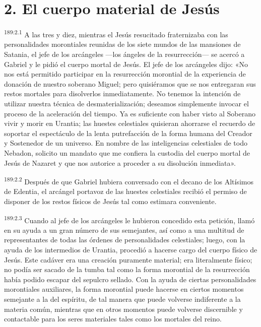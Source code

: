 \section*{2. El cuerpo material de Jesús}
\par
\textsuperscript{189:2.1} A las tres y diez, mientras el Jesús resucitado fraternizaba con las personalidades morontiales reunidas de los siete mundos de las mansiones de Satania, el jefe de los arcángeles ---los ángeles de la resurrección--- se acercó a Gabriel y le pidió el cuerpo mortal de Jesús. El jefe de los arcángeles dijo: «No nos está permitido participar en la resurrección morontial de la experiencia de donación de nuestro soberano Miguel; pero quisiéramos que se nos entregaran sus restos mortales para disolverlos inmediatamente. No tenemos la intención de utilizar nuestra técnica de desmaterialización; deseamos simplemente invocar el proceso de la aceleración del tiempo. Ya es suficiente con haber visto al Soberano vivir y morir en Urantia; las huestes celestiales quisieran ahorrarse el recuerdo de soportar el espectáculo de la lenta putrefacción de la forma humana del Creador y Sostenedor de un universo. En nombre de las inteligencias celestiales de todo Nebadon, solicito un mandato que me confiera la custodia del cuerpo mortal de Jesús de Nazaret y que nos autorice a proceder a su disolución inmediata».

\par
\textsuperscript{189:2.2} Después de que Gabriel hubiera conversado con el decano de los Altísimos de Edentia, el arcángel portavoz de las huestes celestiales recibió el permiso de disponer de los restos físicos de Jesús tal como estimara conveniente.

\par
\textsuperscript{189:2.3} Cuando al jefe de los arcángeles le hubieron concedido esta petición, llamó en su ayuda a un gran número de sus semejantes, así como a una multitud de representantes de todas las órdenes de personalidades celestiales; luego, con la ayuda de los intermedios de Urantia, procedió a hacerse cargo del cuerpo físico de Jesús. Este cadáver era una creación puramente material; era literalmente físico; no podía ser sacado de la tumba tal como la forma morontial de la resurrección había podido escapar del sepulcro sellado. Con la ayuda de ciertas personalidades morontiales auxiliares, la forma morontial puede hacerse en ciertos momentos semejante a la del espíritu, de tal manera que puede volverse indiferente a la materia común, mientras que en otros momentos puede volverse discernible y contactable para los seres materiales tales como los mortales del reino.

